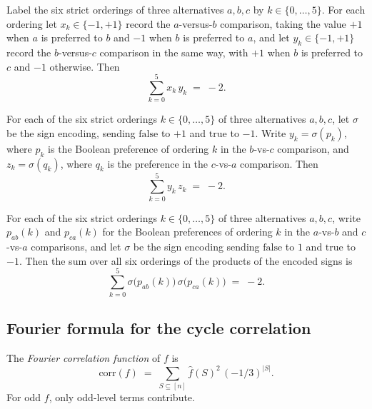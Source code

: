 \begin{lemma}
\label{ArrowTheorem.sum_abPref_bcPref}
\label{ArrowTheorem.sum_bcPref_caPref}
\label{ArrowTheorem.sum_abPref_caPref}
\leanok
{}
Label the six strict orderings of three alternatives $a,b,c$ by $k\in\{0,\dots,5\}$. For
each ordering let $x_k\in\{-1,+1\}$ record the $a$-versus-$b$ comparison, taking the
value $+1$ when $a$ is preferred to $b$ and $-1$ when $b$ is preferred to $a$, and let
$y_k\in\{-1,+1\}$ record the $b$-versus-$c$ comparison in the same way, with $+1$ when
$b$ is preferred to $c$ and $-1$ otherwise. Then
\[
\sum_{k=0}^{5} x_k\,y_k \;=\; -2.
\]

For each of the six strict orderings $k \in \{0,\dots,5\}$ of three alternatives
$a,b,c$, let $\sigma$ be the sign encoding, sending $\mathrm{false}$ to $+1$ and
$\mathrm{true}$ to $-1$. Write $y_k = \sigma(p_k)$, where $p_k$ is the Boolean
preference of ordering $k$ in the $b$-vs-$c$ comparison, and $z_k = \sigma(q_k)$, where
$q_k$ is the preference in the $c$-vs-$a$ comparison. Then
\[
\sum_{k=0}^{5} y_k\, z_k \;=\; -2.
\]

For each of the six strict orderings $k \in \{0,\dots,5\}$ of three alternatives
$a,b,c$, write $p_{ab}(k)$ and $p_{ca}(k)$ for the Boolean preferences of ordering $k$
in the $a$-vs-$b$ and $c$-vs-$a$ comparisons, and let $\sigma$ be the sign encoding
sending $\mathrm{false}$ to $1$ and $\mathrm{true}$ to $-1$. Then the sum over all six
orderings of the products of the encoded signs is
\[
\sum_{k=0}^{5} \sigma\big(p_{ab}(k)\big)\,\sigma\big(p_{ca}(k)\big)
\;=\; -2.
\]
\end{lemma}

\subsection{Fourier formula for the cycle correlation}

\begin{definition}
\label{ArrowTheorem.corrFunc}
\leanok
{}
The \emph{Fourier correlation function} of $f$ is
\[
  \mathrm{corr}(f) \;=\; \sum_{S\subseteq[n]} \hat f(S)^2\,(-1/3)^{|S|}.
\]
For odd $f$, only odd-level terms contribute.
\end{definition}


